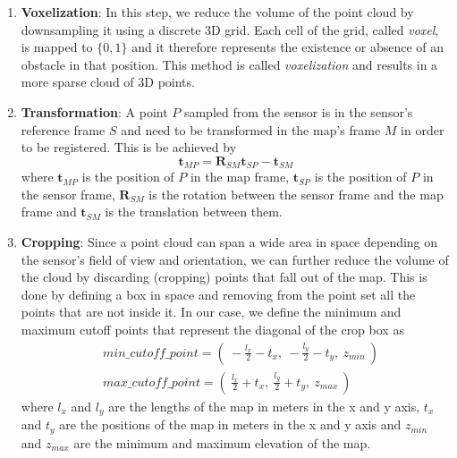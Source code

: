 \begin{enumerate}
    \item \textbf{Voxelization}:
        In this step, we reduce the volume of the point cloud by downsampling
        it using a discrete 3D grid.
        Each cell of the grid, called \textit{voxel}, is mapped to $\{0,1\}$
        and it therefore represents the existence or absence of an obstacle
        in that position.
        This method is called \textit{voxelization} and results in a more
        sparse cloud of 3D points.


    \item \textbf{Transformation}:
        A point $P$ sampled from the sensor is in the sensor's reference frame
        $S$ and need to be transformed in the map's frame $M$ in order to be
        registered.
        This is be achieved by
        \begin{equation} \label{eq:point_cloud_tf}
            \mathbf{t}_{MP} =
                \mathbf{R}_{SM} \mathbf{t}_{SP} -
                \mathbf{t}_{SM}
        \end{equation}
        where
        $\mathbf{t}_{MP}$ is the position of $P$ in the map frame,
        $\mathbf{t}_{SP}$ is the position of $P$ in the sensor frame,
        $\mathbf{R}_{SM}$ is the rotation between the sensor frame and the
        map frame and
        $\mathbf{t}_{SM}$ is the translation between them.

    \item \textbf{Cropping}:
        Since a point cloud can span a wide area in space depending on the
        sensor's field of view and orientation, we can further reduce the
        volume of the cloud by discarding (cropping) points that fall out
        of the map.
        This is done by defining a box in space and removing
        from the point set all the points that are not inside it.
        In our case, we define the minimum and maximum cutoff points that
        represent the diagonal of the crop box as
        \begin{equation}
        \begin{aligned}
            &min\_cutoff\_point =
                \left( \
                    - \frac{l_x}{2} - t_x, \
                    - \frac{l_y}{2} - t_y, \
                    z_{min} \
                \right) \\
            &max\_cutoff\_point =
                \left( \
                    \frac{l_x}{2} + t_x, \
                    \frac{l_y}{2} + t_y, \
                    z_{max} \
                \right)
        \end{aligned}
        \end{equation}
        where
        $l_x$ and $l_y$ are the lengths of the map in meters in the
        x and y axis,
        $t_x$ and $t_y$ are the positions of the map in meters in the
        x and y axis and
        $z_{min}$ and $z_{max}$ are the minimum and maximum elevation
        of the map.


\end{enumerate}
